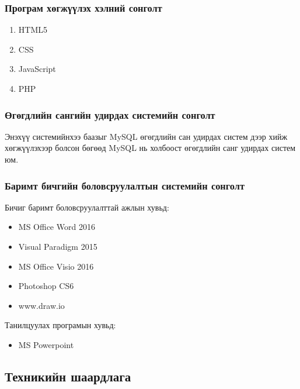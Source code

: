 \subsubsection{Програм хөгжүүлэх хэлний сонголт}
\begin{enumerate}
	\item HTML5
	\item CSS
	\item JavaScript
	\item PHP
\end{enumerate}

\subsubsection{Өгөгдлийн сангийн удирдах системийн сонголт}
\qquad
Энэхүү системийнхээ баазыг MySQL өгөгдлийн сан удирдах систем дээр хийж хөгжүүлэхээр болсон бөгөөд MySQL нь холбоост өгөгдлийн санг удирдах систем юм. 
\subsubsection{Баримт бичгийн боловсруулалтын системийн сонголт}
Бичиг баримт боловсруулалттай ажлын хувьд: 
\begin{itemize}
	\item MS Office Word 2016 
	\item Visual Paradigm 2015 
	\item MS Office Visio 2016
	\item Photoshop CS6 
	\item www.draw.io 
\end{itemize}
Танилцуулах програмын хувьд: 
\begin{itemize}
	\item MS Powerpoint 
\end{itemize}
\vspace*{1.5in} 
\subsection{Техникийн шаардлага}
